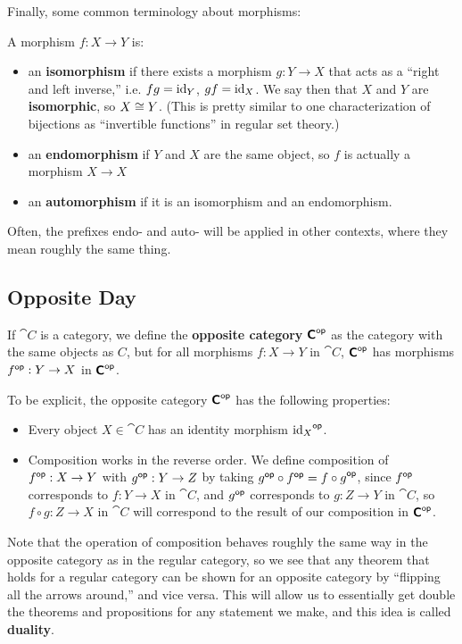 Finally, some common terminology about morphisms:
\begin{definition}
  A morphism $f : X \to Y$ is:
  \begin{itemize}
    \item an \textbf{isomorphism} if there exists a morphism $g: Y \to X$ that acts as a ``right and left inverse,'' i.e. $fg = \mathrm{id}_Y$, $gf = \mathrm{id}_X$. We say then that $X$ and $Y$ are \textbf{isomorphic}, so $X \cong Y$. (This is pretty similar to one characterization of bijections as ``invertible functions'' in regular set theory.)
    \item an \textbf{endomorphism} if $Y$ and $X$ are the same object, so $f$ is actually a morphism $X \to X$
    \item an \textbf{automorphism} if it is an isomorphism and an endomorphism.
  \end{itemize}
\end{definition}
Often, the prefixes endo- and auto- will be applied in other contexts, where they mean roughly the same thing.

\subsection{Opposite Day}
\begin{definition}
  If $\cat C$ is a category, we define the \textbf{opposite category} ${\bm{\mathsf{C}}}^{\mathsf{op}}$ as the category with the same objects as $C$, but for all morphisms $f : X \to Y$ in $\cat C$, ${\bm{\mathsf{C}}}^{\mathsf{op}}$ has morphisms ${f}^{\mathsf{op}} : Y \to X$ in ${\bm{\mathsf{C}}}^{\mathsf{op}}$.

  To be explicit, the opposite category ${\bm{\mathsf{C}}}^{\mathsf{op}}$ has the following properties:
  \begin{itemize}
    \item Every object $X \in \cat C$ has an identity morphism ${\mathrm{id}_X}^{\mathsf{op}}$.
    \item Composition works in the reverse order. We define composition of ${f}^{\mathsf{op}} : X \to Y$ with ${g}^{\mathsf{op}} : Y \to Z$ by taking ${g}^{\mathsf{op}} \circ {f}^{\mathsf{op}} =  {f \circ g}^{\mathsf{op}}$, since ${f}^{\mathsf{op}}$ corresponds to $f : Y \to X$ in $\cat C$, and ${g}^{\mathsf{op}}$ corresponds to $g : Z \to Y$ in $\cat C$, so $f \circ g : Z \to X$ in $\cat C$ will correspond to the result of our composition in ${\bm{\mathsf{C}}}^{\mathsf{op}}$.
  \end{itemize}
\end{definition}
Note that the operation of composition behaves roughly the same way in the opposite category as in the regular category, so we see that any theorem that holds for a regular category can be shown for an opposite category by ``flipping all the arrows around,'' and vice versa. This will allow us to essentially get double the theorems and propositions for any statement we make, and this idea is called \textbf{duality}.

